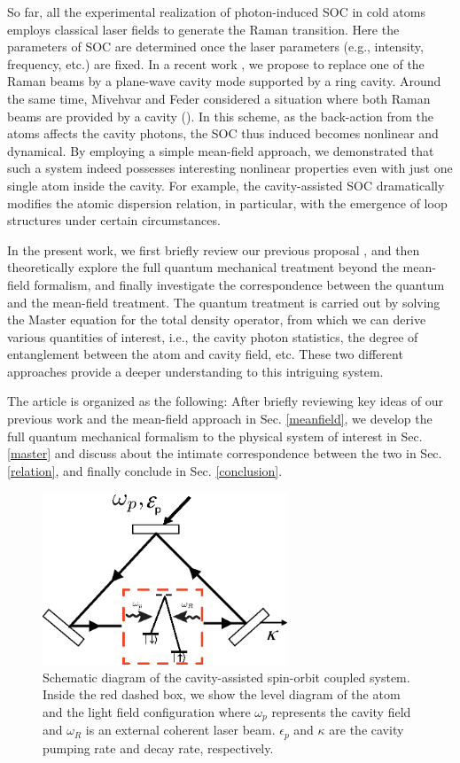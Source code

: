 \documentclass[atoms,article,submit,moreauthors,pdftex,12pt,a4paper]{mdpi}
\begin{document}
So far, all the experimental realization of photon-induced SOC in cold atoms employs classical laser fields to generate the Raman transition. Here the parameters of SOC are determined once the laser parameters (e.g., intensity, frequency, etc.) are fixed. In a recent work \cite{cavitySOC}, we propose to replace one of the Raman beams by a plane-wave cavity mode supported by a ring cavity. Around the same time, Mivehvar and Feder considered a situation where both Raman beams are provided by a cavity (\cite{Feder}). In this scheme, as the back-action from the atoms affects the cavity photons, the SOC thus induced becomes nonlinear and dynamical. By employing a simple mean-field approach, we demonstrated \cite{cavitySOC} that such a system indeed possesses interesting nonlinear properties even with just one single atom inside the cavity. For example, the cavity-assisted SOC dramatically modifies the atomic dispersion relation, in particular, with the emergence of loop structures under certain circumstances.
  
In the present work, we first briefly review our previous proposal \cite{cavitySOC}, and then theoretically explore the full quantum mechanical treatment beyond the mean-field formalism, and finally investigate the correspondence between the quantum and the mean-field treatment. The quantum treatment is carried out by solving the Master equation for the total density operator, from which we can derive various quantities of interest, i.e., the cavity photon statistics, the degree of entanglement between the atom and cavity field, etc. These two different approaches provide a deeper understanding to this intriguing system. 

The article is organized as the following: After briefly reviewing key ideas of our previous work and the mean-field approach in Sec. \ref{meanfield}, we develop the full quantum mechanical formalism to the physical system of interest in Sec. \ref{master} and discuss about the intimate correspondence between the two in Sec. \ref{relation}, and finally conclude in Sec. \ref{conclusion}. 

\begin{figure}[htp]
\includegraphics[width=0.65\textwidth]{schematic}\caption{Schematic diagram of the cavity-assisted spin-orbit coupled system. Inside the red dashed box, we show the level diagram of the atom and the light field configuration where $\omega_p$ represents the cavity field and $\omega_R$ is an external coherent laser beam. $\epsilon_p$ and $\kappa$ are the cavity pumping rate and decay rate, respectively.}\label{schematic}
\end{figure}
\end{document}
